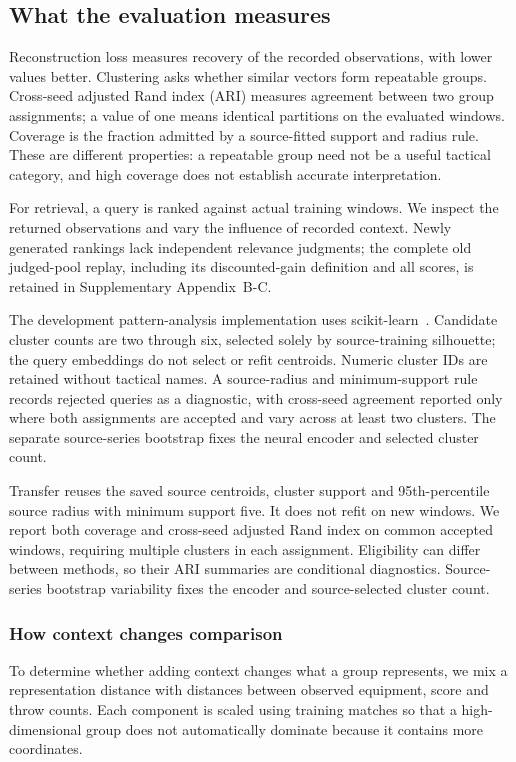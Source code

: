 \subsection{What the evaluation measures}
Reconstruction loss measures recovery of the recorded observations, with lower values better. Clustering asks whether similar vectors form repeatable groups. Cross-seed adjusted Rand index (ARI) measures agreement between two group assignments; a value of one means identical partitions on the evaluated windows. Coverage is the fraction admitted by a source-fitted support and radius rule. These are different properties: a repeatable group need not be a useful tactical category, and high coverage does not establish accurate interpretation.

For retrieval, a query is ranked against actual training windows. We inspect the returned observations and vary the influence of recorded context. Newly generated rankings lack independent relevance judgments; the complete old judged-pool replay, including its discounted-gain definition and all scores, is retained in Supplementary Appendix~B-C.

The development pattern-analysis implementation uses scikit-learn~\cite{pedregosa2011sklearn}. Candidate cluster counts are two through six, selected solely by source-training silhouette; the query embeddings do not select or refit centroids. Numeric cluster IDs are retained without tactical names. A source-radius and minimum-support rule records rejected queries as a diagnostic, with cross-seed agreement reported only where both assignments are accepted and vary across at least two clusters. The separate source-series bootstrap fixes the neural encoder and selected cluster count. %

Transfer reuses the saved source centroids, cluster support and 95th-percentile source radius with minimum support five. It does not refit on new windows. We report both coverage and cross-seed adjusted Rand index on common accepted windows, requiring multiple clusters in each assignment. Eligibility can differ between methods, so their ARI summaries are conditional diagnostics. Source-series bootstrap variability fixes the encoder and source-selected cluster count. %

\subsubsection{How context changes comparison}
To determine whether adding context changes what a group represents, we mix a representation distance with distances between observed equipment, score and throw counts. Each component is scaled using training matches so that a high-dimensional group does not automatically dominate because it contains more coordinates.

